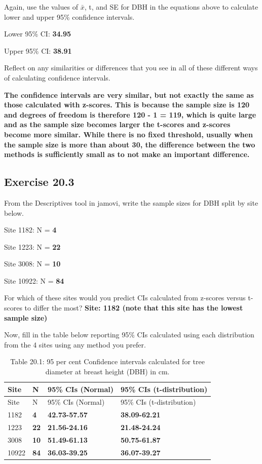 \documentclass[
]{scrbook}
\begin{document}
Again, use the values of \(\bar{x}\), t, and SE for DBH in the equations above to calculate lower and upper 95\% confidence intervals.

Lower 95\% CI: \textbf{34.95}

Upper 95\% CI: \textbf{38.91}

Reflect on any similarities or differences that you see in all of these different ways of calculating confidence intervals.

\textbf{The confidence intervals are very similar, but not exactly the same as those calculated with z-scores. This is because the sample size is 120 and degrees of freedom is therefore 120 - 1 = 119, which is quite large and as the sample size becomes larger the t-scores and z-scores become more similar. While there is no fixed threshold, usually when the sample size is more than about 30, the difference between the two methods is sufficiently small as to not make an important difference.}

\hypertarget{exercise-20.3}{%
\subsection{Exercise 20.3}\label{exercise-20.3}}

From the Descriptives tool in jamovi, write the sample sizes for DBH split by site below.

Site 1182: N = \textbf{4}

Site 1223: N = \textbf{22}

Site 3008: N = \textbf{10}

Site 10922: N = \textbf{84}

For which of these sites would you predict CIs calculated from z-scores versus t- scores to differ the most? \textbf{Site: 1182 (note that this site has the lowest sample size)}

Now, fill in the table below reporting 95\% CIs calculated using each distribution from the 4 sites using any method you prefer.

\begin{longtable}[]{@{}llll@{}}
\caption{Table 20.1: 95 per cent Confidence intervals calculated for tree diameter at breast height (DBH) in cm.}\tabularnewline
\toprule
Site & N & 95\% CIs (Normal) & 95\% CIs (t-distribution) \\
\midrule
\endfirsthead
\toprule
Site & N & 95\% CIs (Normal) & 95\% CIs (t-distribution) \\
\midrule
\endhead
1182 & \textbf{4} & \textbf{42.73-57.57} & \textbf{38.09-62.21} \\
1223 & \textbf{22} & \textbf{21.56-24.16} & \textbf{21.48-24.24} \\
3008 & \textbf{10} & \textbf{51.49-61.13} & \textbf{50.75-61.87} \\
10922 & \textbf{84} & \textbf{36.03-39.25} & \textbf{36.07-39.27} \\
\bottomrule
\end{longtable}
\end{document}
